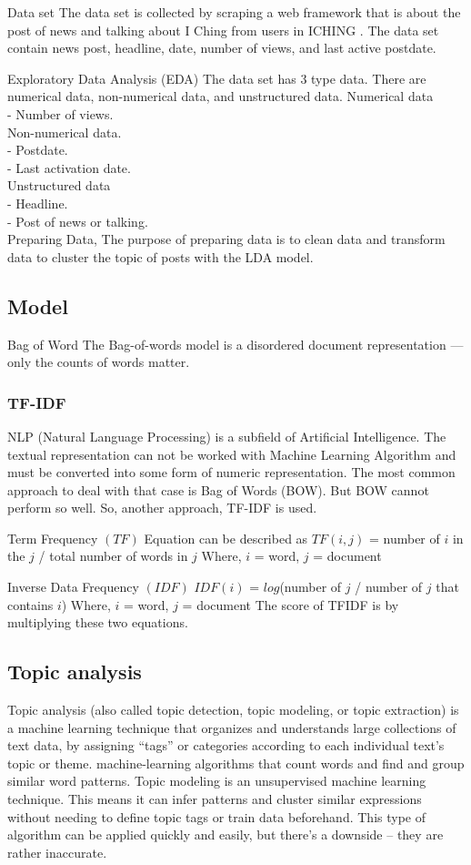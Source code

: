 \documentclass[conference]{IEEEtran}
\begin{document}
Data set 
The data set is collected by scraping a web framework that is about the post of news and talking about I Ching from users in ICHING . The data set contain news post, headline, date, number of views, and last active postdate.

Exploratory Data Analysis (EDA)
The data set has 3 type data. There are numerical data, non-numerical data, and unstructured data.
Numerical data\\
- Number of views.\\
Non-numerical data.\\
- Postdate.\\
- Last activation date.\\
Unstructured data\\
- Headline.\\
- Post of news or talking.\\

Preparing Data, The purpose of preparing data is to clean data and transform data to cluster the topic of posts with the LDA  model.

\subsection{Model}
Bag of Word
The Bag-of-words model is a disordered document representation — only the counts of words matter.



\subsubsection{TF-IDF}
NLP (Natural Language Processing) is a subfield of Artificial Intelligence. The textual representation can not be worked with Machine Learning Algorithm and must be converted into some form of numeric representation. The most common approach to deal with that case is Bag of Words (BOW). But BOW cannot perform so well. So, another approach, TF-IDF is used.

Term Frequency $(TF)$ Equation can be described as
$TF(i, j)$ = number of $i$ in the $j$ / total number of words in $j$
Where, $i$ = word, $j$ = document

Inverse Data Frequency $(IDF)$
$IDF (i)$ = $log$(number of $j$ / number of $j$ that contains $i$)
Where, $i$ = word, $j$ = document
The score of TFIDF is by multiplying these two equations.


\subsection{Topic analysis}
Topic analysis (also called topic detection, topic modeling, or topic extraction) is a machine learning technique that organizes and understands large collections of text data, by assigning “tags” or categories according to each individual text’s topic or theme. machine-learning algorithms that count words and find and group similar word patterns.
Topic modeling is an unsupervised machine learning technique. This means it can infer patterns and cluster similar expressions without needing to define topic tags or train data beforehand. This type of algorithm can be applied quickly and easily, but there’s a downside – they are rather inaccurate.
\end{document}
